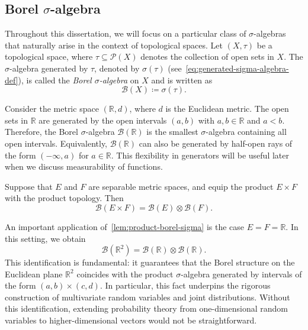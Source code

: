 \subsection{Borel $\sigma$-algebra}

Throughout this dissertation, we will focus on a particular class of $\sigma$-algebras that naturally arise in the context of topological spaces. Let $(X, \tau)$ be a topological space, where $\tau \subseteq \mathcal{P}(X)$ denotes the collection of open sets in $X$. The $\sigma$-algebra generated by $\tau$, denoted by $\sigma(\tau)$ (see~\ref{eq:generated-sigma-algebra-def}), is called the \emph{Borel $\sigma$-algebra} on $X$ and is written as
\[
    \mathcal{B}(X) \coloneq \sigma(\tau).
\]

\begin{example}
    Consider the metric space $(\mathbb{R}, d)$, where $d$ is the Euclidean metric. The open sets in $\mathbb{R}$ are generated by the open intervals $(a, b)$ with $a, b \in \mathbb{R}$ and $a < b$. Therefore, the Borel $\sigma$-algebra $\mathcal{B}(\mathbb{R})$ is the smallest $\sigma$-algebra containing all open intervals. Equivalently, $\mathcal{B}(\mathbb{R})$ can also be generated by half-open rays of the form $(-\infty, a)$ for $a \in \mathbb{R}$. This flexibility in generators will be useful later when we discuss measurability of functions.
\end{example}

\begin{lemma}
    \label{lem:product-borel-sigma}
    Suppose that $E$ and $F$ are separable metric spaces, and equip the product $E \times F$ with the product topology. Then
    \[
        \mathcal{B}(E \times F) = \mathcal{B}(E) \otimes \mathcal{B}(F).
    \]
\end{lemma}

\begin{remarknl}
    An important application of~\ref{lem:product-borel-sigma} is the case $E = F = \mathbb{R}$. In this setting, we obtain
    \[
        \mathcal{B}(\mathbb{R}^2) = \mathcal{B}(\mathbb{R}) \otimes \mathcal{B}(\mathbb{R}).
    \]
    This identification is fundamental: it guarantees that the Borel structure on the Euclidean plane $\mathbb{R}^2$ coincides with the product $\sigma$-algebra generated by intervals of the form $(a, b) \times (c, d)$. In particular, this fact underpins the rigorous construction of multivariate random variables and joint distributions. Without this identification, extending probability theory from one-dimensional random variables to higher-dimensional vectors would not be straightforward.
\end{remarknl}

